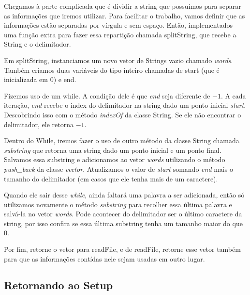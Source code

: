\documentclass[12pt]{article}
\begin{document}


Chegamos à parte complicada que é dividir a string que possuímos para separar as informações que iremos utilizar. Para facilitar o trabalho, vamos definir que as informações estão separadas por vírgula e sem espaço. Então, implementados uma função extra para fazer essa repartição chamada splitString, que recebe a String e o delimitador.



Em splitString, instanciamos um novo vetor de Strings vazio chamado \textit{words}. Também criamos duas variáveis do tipo inteiro chamadas de start (que é inicializada em 0) e end. 



Fizemos uso de um while. A condição dele é que \textit{end} seja diferente de $-1$. A cada iteração, \textit{end} recebe o index do delimitador na string dado um ponto inicial \textit{start}. Descobrindo isso com o método \textit{indexOf} da classe String. Se ele não encontrar o delimitador, ele retorna $-1$. 

Dentro do While, iremos fazer o uso de outro método da classe String chamada \textit{substring} que retorna uma string dado um ponto inicial e um ponto final. Salvamos essa substring e adicionamos ao vetor \textit{words} utilizando o método \textit{push\_back} da classe \textit{vector}. Atualizamos o valor de \textit{start} somando \textit{end} mais o tamanho do delimitador (em casos que ele tenha mais de um caractere).

 

Quando ele sair desse \textit{while}, ainda faltará uma palavra a ser adicionada, então só utilizamos novamente o método \textit{substring} para recolher essa última palavra e salvá-la no vetor \textit{words}. Pode acontecer do delimitador ser o último caractere da string, por isso confira se essa última substring tenha um tamanho maior do que 0.



Por fim, retorne o vetor para readFile, e de readFile, retorne esse vetor também para que as informações contídas nele sejam usadas em outro lugar.

\subsection{Retornando ao Setup}
\end{document}
